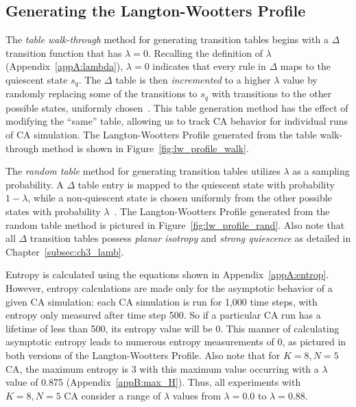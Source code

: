 \documentclass[a4paper,11pt,twoside]{report}
\begin{document}
\subsection*{Generating the Langton-Wootters Profile}

The \textit{table walk-through} method for generating transition tables begins with a $\Delta$ transition function that has $\lambda = 0$. Recalling the definition of $\lambda$ (Appendix~\ref{appA:lambda}), $\lambda=0$ indicates that every rule in $\Delta$ maps to the quiescent state $s_q$. The $\Delta$ table is then \textit{incremented} to a higher $\lambda$ value by randomly replacing some of the transitions to $s_q$ with transitions to the other possible states, uniformly chosen~\cite{la90}. This table generation method has the effect of modifying the ``same'' table, allowing us to track CA behavior for individual runs of CA simulation. The Langton-Wootters Profile generated from the table walk-through method is shown in Figure~\ref{fig:lw_profile_walk}.

The \textit{random table} method for generating transition tables utilizes $\lambda$ as a sampling probability. A $\Delta$ table entry is mapped to the quiescent state with probability $1 - \lambda$, while a non-quiescent state is chosen uniformly from the other possible states with probability $\lambda$~\cite{la90}. The Langton-Wootters Profile generated from the random table method is pictured in Figure~\ref{fig:lw_profile_rand}. Also note that all $\Delta$ transition tables possess \textit{planar isotropy} and \textit{strong quiescence} as detailed in Chapter~\ref{subsec:ch3_lamb}.

Entropy is calculated using the equations shown in Appendix~\ref{appA:entrop}. However, entropy calculations are made only for the asymptotic behavior of a given CA simulation: each CA simulation is run for 1,000 time steps, with entropy only measured after time step 500. So if a particular CA run has a lifetime of less than 500, its entropy value will be 0. This manner of calculating asymptotic entropy leads to numerous entropy measurements of 0, as pictured in both versions of the Langton-Wootters Profile. Also note that for $K=8, N=5$ CA, the maximum entropy is 3 with this maximum value occurring with a $\lambda$ value of 0.875 (Appendix~\ref{appB:max_H}). Thus, all experiments with $K=8, N=5$ CA consider a range of $\lambda$ values from $\lambda = 0.0$ to $\lambda = 0.88$. 
\end{document}
